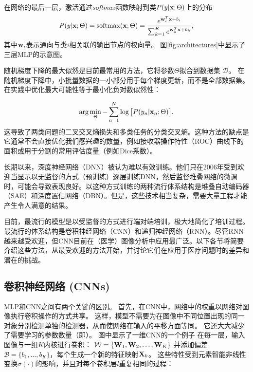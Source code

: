 在网络的最后一层，激活通过{\it softmax}函数映射到类$P(y | {\bf x}; \Theta)$上的分布
\begin{equation}
 P(y | {\bf x}; \Theta) = \text{softmax}({\bf x}; \Theta) = \frac{e^{{\bf w}_{i}^{T}{\bf x} + b_{i}}}{\sum^{K}_{k = 1} e^{{\bf w}_{k}^{T}{\bf x} + b_{k}}},
\end{equation}
其中${\bf w}_{i}$表示通向与类$i$相关联的输出节点的权向量。 图\ref{fig:architectures}中显示了三层MLP的示意图。

随机梯度下降的最大似然是目前最常用的方法，它将参数$\Theta$拟合到数据集 $\mathcal{D}$。 在随机梯度下降中，小批量数据的一小部分用于每个梯度更新，而不是全部数据集。 在实践中优化最大可能性等于最小化负对数似然性：

\begin{equation}
 \arg \min_{\Theta} - \sum^{N}_{n = 1} \log\big[ P(y_{n}| {\bf x}_{n}; \Theta) \big].
\end{equation}
这导致了两类问题的二叉交叉熵损失和多类任务的分类交叉熵。这种方法的缺点是它通常不会直接优化我们感兴趣的数量，例如接收器操作特性（ROC）曲线下的面积或用于分割的常用评估度量（例如Dice系数）。

长期以来，深度神经网络（DNN）被认为难以有效训练。他们只在2006年受到欢迎\citep{Beng07,Hint06,Hint06a}当显示以无监督的方式（预训练）逐层训练DNN，然后监督堆叠网络的微调时，可能会导致表现良好。以这种方式训练的两种流行体系结构是堆叠自动编码器（SAE）和深度置信网络（DBN）。但是，这些技术相当复杂，需要大量工程才能产生令人满意的结果。

目前，最流行的模型是以受监督的方式进行端对端培训，极大地简化了培训过程。最流行的体系结构是卷积神经网络（CNN）和递归神经网络（RNN）。尽管RNN越来越受欢迎，但CNN目前在（医学）图像分析中应用最广泛。以下各节将简要介绍这些方法，从最受欢迎的方法开始，并讨论它们在应用于医疗问题时的差异和潜在的挑战。

\subsection{卷积神经网络 (CNNs)}
MLP和CNN之间有两个关键的区别。 首先，在CNN中，网络中的权重以网络对图像执行卷积操作的方式共享。 这样，模型不需要为在图像中不同位置出现的同一对象分别检测单独的检测器，从而使网络在输入的平移方面等同。 它还大大减少了需要学习的参数数量（即）。 图中显示了一维CNN的一个例子
在每一层，输入图像与一组$K$内核进行卷积： $\mathcal{W} = \{ {\bf W}_{1}, {\bf W}_{2}, \ldots, {\bf W}_{K} \}$ 并添加偏差$\mathcal{B} = \{b_{1}, \ldots, b_{K}\}$，每个生成一个新的特征映射${\bf X}_{k}$。 这些特性受到元素智能非线性变换$\sigma(\cdot)$的影响，并且对每个卷积层$l$重复相同的过程：

